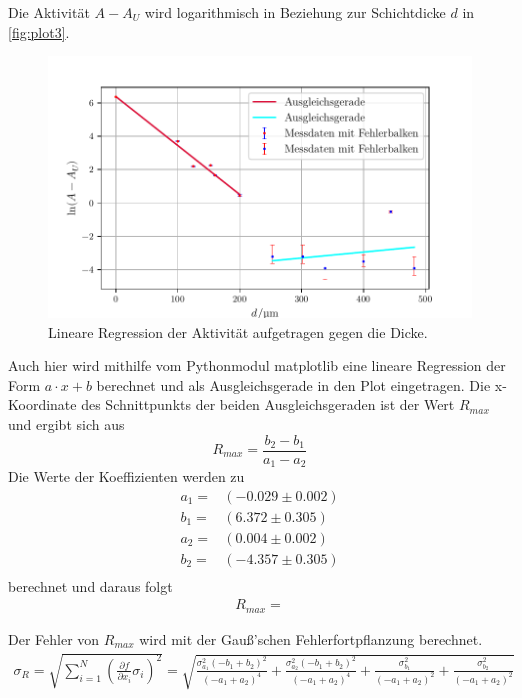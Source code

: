  Die Aktivität $A-A_U$ wird logarithmisch in Beziehung zur Schichtdicke $d$ in \autoref{fig:plot3}.
\begin{figure}[H]
  \centering
  \includegraphics{build/plot3.pdf}
  \caption {Lineare Regression der Aktivität aufgetragen gegen die Dicke.}
  \label{fig:plot3}
\end{figure}

Auch hier wird mithilfe vom Pythonmodul matplotlib \cite{matplotlib} eine lineare Regression der Form $a \cdot x + b$ berechnet und 
als Ausgleichsgerade in den Plot eingetragen. 
Die x-Koordinate des Schnittpunkts der beiden Ausgleichsgeraden ist der Wert $R_{max}$ und ergibt
sich aus
\begin{equation}
  R_{max} =  \frac{b_2 - b_1}{a_1 - a_2}
  \label{eqn:Rmax}
\end{equation}
Die Werte der Koeffizienten werden zu
\begin{align}
  a_1 =& (-0.029 \pm 0.002)\\
  b_1 =& (6.372 \pm 0.305) \\
  a_2 =& (0.004 \pm 0.002)\\
  b_2 =& (-4.357 \pm 0.305)\\
\end{align}
berechnet und daraus folgt
\begin{align}
  R_{max}= 
\end{align}



Der Fehler von $R_{max}$ wird mit der Gauß'schen Fehlerfortpflanzung berechnet.
\begin{align*}
  \sigma_R = \sqrt{
      \sum\limits_{i = 1}^N
       \left( \frac{\partial f}{\partial x_i} \sigma_i \right)^{\!\! 2}
     }
     =\sqrt{\frac{\sigma_{a_{1}}^{2} \left(- b_{1} + b_{2}\right)^{2}}{\left(- a_{1} + a_{2}\right)^{4}}
  + \frac{\sigma_{a_{2}}^{2} \left(- b_{1} + b_{2}\right)^{2}}{\left(- a_{1} + a_{2}\right)^{4}} + \frac{\sigma_{b_{1}}^{2}}{\left(- a_{1}
  + a_{2}\right)^{2}} + \frac{\sigma_{b_{2}}^{2}}{\left(- a_{1} + a_{2}\right)^{2}}}
\end{align*}

